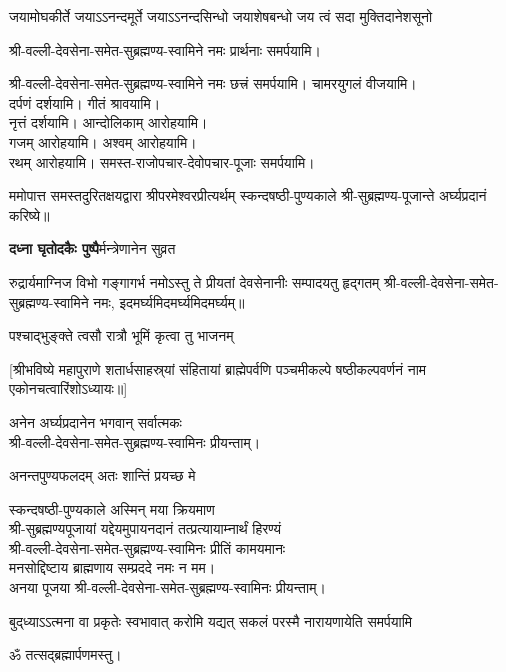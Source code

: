 \begin{center}
{जयामोघकीर्ते जयाऽऽनन्दमूर्ते}
{जयाऽऽनन्दसिन्धो जयाशेषबन्धो}
{जय त्वं सदा मुक्तिदानेशसूनो}

श्री-वल्ली-देवसेना-समेत-सुब्रह्मण्य-स्वामिने नमः प्रार्थनाः समर्पयामि।

श्री-वल्ली-देवसेना-समेत-सुब्रह्मण्य-स्वामिने नमः छत्त्रं समर्पयामि।
चामरयुगलं वीजयामि।\\
दर्पणं दर्शयामि। गीतं श्रावयामि। \\
नृत्तं दर्शयामि। आन्दोलिकाम् आरोहयामि।\\
गजम् आरोहयामि। अश्वम् आरोहयामि।\\
रथम् आरोहयामि। समस्त-राजोपचार-देवोपचार-पूजाः समर्पयामि।


ममोपात्त समस्तदुरितक्षयद्वारा श्रीपरमेश्वरप्रीत्यर्थम् स्कन्दषष्ठी-पुण्यकाले श्री-सुब्रह्मण्य-पूजान्ते अर्घ्यप्रदानं करिष्ये॥

\medskip

{\textbf{दध्ना घृतोदकैः पुष्पै}र्मन्त्रेणानेन सुव्रत}

{रुद्रार्यमाग्निज विभो गङ्गागर्भ नमोऽस्तु ते}
{प्रीयतां देवसेनानीः सम्पादयतु हृद्गतम्}
श्री-वल्ली-देवसेना-समेत-सुब्रह्मण्य-स्वामिने नमः, इदमर्घ्यमिदमर्घ्यमिदमर्घ्यम्॥\medskip

{पश्चाद्भुङ्क्ते त्वसौ रात्रौ भूमिं कृत्वा तु भाजनम्}

[श्रीभविष्ये महापुराणे शतार्धसाहस्र्यां संहितायां ब्राह्मेपर्वणि पञ्चमीकल्पे षष्ठीकल्पवर्णनं नाम एकोनचत्वारिंशोऽध्यायः॥]


अनेन अर्घ्यप्रदानेन भगवान् सर्वात्मकः\\ श्री-वल्ली-देवसेना-समेत-सुब्रह्मण्य-स्वामिनः प्रीयन्ताम्।\medskip

{अनन्तपुण्यफलदम् अतः शान्तिं प्रयच्छ मे}

स्कन्दषष्ठी-पुण्यकाले अस्मिन् मया क्रियमाण\\
श्री-सुब्रह्मण्यपूजायां यद्देयमुपायनदानं तत्प्रत्यायाम्नार्थं हिरण्यं\\
श्री-वल्ली-देवसेना-समेत-सुब्रह्मण्य-स्वामिनः प्रीतिं कामयमानः\\
मनसोद्दिष्टाय ब्राह्मणाय सम्प्रददे नमः न मम।\\ 
अनया पूजया श्री-वल्ली-देवसेना-समेत-सुब्रह्मण्य-स्वामिनः प्रीयन्ताम्। 
 

{बुद्‌ध्याऽऽत्मना वा प्रकृतेः स्वभावात्}
{करोमि यद्यत् सकलं परस्मै}
{नारायणायेति समर्पयामि}

ॐ तत्सद्ब्रह्मार्पणमस्तु।

\end{center}
